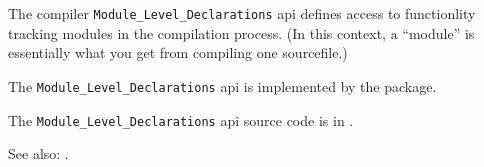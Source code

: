 
The compiler {\tt Module\_Level\_Declarations} api defines access to functionlity tracking modules 
in the compilation process.    (In this context, a ``module'' is essentially what you get from 
compiling one sourcefile.)

The {\tt Module\_Level\_Declarations} api is implemented by the  package.

The {\tt Module\_Level\_Declarations} api source code is in .

See also:  .


